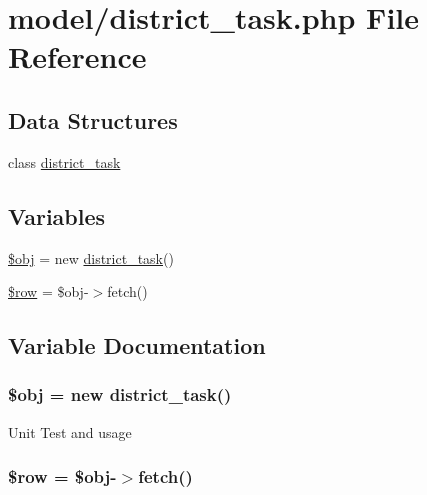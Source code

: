 \hypertarget{district__task_8php}{}\section{model/district\+\_\+task.php File Reference}
\label{district__task_8php}
\subsection*{Data Structures}
\begin{DoxyCompactItemize}
\item 
class \hyperlink{classdistrict__task}{district\+\_\+task}
\end{DoxyCompactItemize}
\subsection*{Variables}
\begin{DoxyCompactItemize}
\item 
\hyperlink{district__task_8php_a9008ed94ba185855b1723e367744b87e}{\$obj} = new \hyperlink{classdistrict__task}{district\+\_\+task}()
\item 
\hyperlink{district__task_8php_aa1d731aa570613e5bcff831bb10e9b87}{\$row} = \$obj-\/$>$fetch()
\end{DoxyCompactItemize}


\subsection{Variable Documentation}
\hypertarget{district__task_8php_a9008ed94ba185855b1723e367744b87e}{}
\subsubsection[{\$obj}]{\setlength{\rightskip}{0pt plus 5cm}\$obj = new {\bf district\+\_\+task}()}\label{district__task_8php_a9008ed94ba185855b1723e367744b87e}
Unit Test and usage \hypertarget{district__task_8php_aa1d731aa570613e5bcff831bb10e9b87}{}
\subsubsection[{\$row}]{\setlength{\rightskip}{0pt plus 5cm}\$row = \$obj-\/$>$fetch()}\label{district__task_8php_aa1d731aa570613e5bcff831bb10e9b87}
